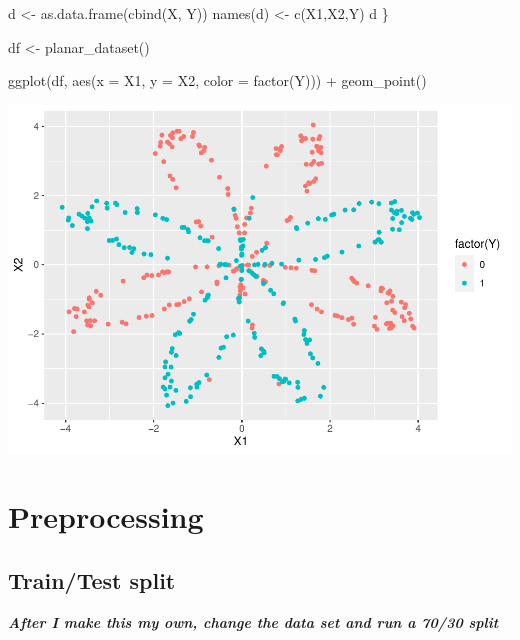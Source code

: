 \documentclass[
]{article}
\newenvironment{Shaded}{\begin{snugshade}}{\end{snugshade}}
\newcommand{\AttributeTok}[1]{\textcolor[rgb]{0.77,0.63,0.00}{#1}}
\newcommand{\FunctionTok}[1]{\textcolor[rgb]{0.00,0.00,0.00}{#1}}
\newcommand{\NormalTok}[1]{#1}
\newcommand{\OtherTok}[1]{\textcolor[rgb]{0.56,0.35,0.01}{#1}}
\newcommand{\SpecialCharTok}[1]{\textcolor[rgb]{0.00,0.00,0.00}{#1}}
\newcommand{\StringTok}[1]{\textcolor[rgb]{0.31,0.60,0.02}{#1}}
\begin{document}
\begin{Shaded}
\begin{Highlighting}[]
\NormalTok{  d }\OtherTok{\textless{}{-}} \FunctionTok{as.data.frame}\NormalTok{(}\FunctionTok{cbind}\NormalTok{(X, Y))}
  \FunctionTok{names}\NormalTok{(d) }\OtherTok{\textless{}{-}} \FunctionTok{c}\NormalTok{(}\StringTok{\textquotesingle{}X1\textquotesingle{}}\NormalTok{,}\StringTok{\textquotesingle{}X2\textquotesingle{}}\NormalTok{,}\StringTok{\textquotesingle{}Y\textquotesingle{}}\NormalTok{)}
\NormalTok{  d}
\NormalTok{\}}


\NormalTok{df }\OtherTok{\textless{}{-}} \FunctionTok{planar\_dataset}\NormalTok{()}


\FunctionTok{ggplot}\NormalTok{(df, }\FunctionTok{aes}\NormalTok{(}\AttributeTok{x =}\NormalTok{ X1, }\AttributeTok{y =}\NormalTok{ X2, }\AttributeTok{color =} \FunctionTok{factor}\NormalTok{(Y))) }\SpecialCharTok{+}
  \FunctionTok{geom\_point}\NormalTok{()}
\end{Highlighting}
\end{Shaded}

\includegraphics{BabyNeuralNet_files/figure-latex/unnamed-chunk-1-1.pdf}

\hypertarget{preprocessing}{%
\section{Preprocessing}\label{preprocessing}}

\hypertarget{traintest-split}{%
\subsection{Train/Test split}\label{traintest-split}}

\textbf{\emph{After I make this my own, change the data set and run a
70/30 split}}
\end{document}
